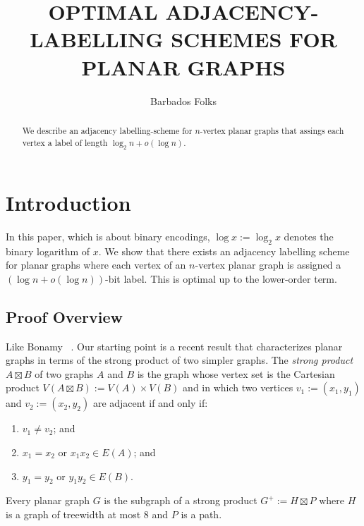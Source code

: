 \documentclass[kpfonts]{patmorin}
\title{\MakeUppercase{Optimal Adjacency-Labelling Schemes for Planar Graphs}}
\author{Barbados Folks}
\begin{document}
\begin{titlepage}
\maketitle

\begin{abstract}
  We describe an adjacency labelling-scheme for $n$-vertex planar graphs that assings each vertex a label of length $\log_2 n+o(\log n)$.
\end{abstract}
\end{titlepage}
\tableofcontents

\newpage

\setcounter{page}{0}
\section{Introduction}

In this paper, which is about binary encodings, $\log x:=\log_2 x$ denotes the binary logarithm of $x$.  We show that there exists an adjacency labelling scheme for planar graphs where each vertex of an $n$-vertex planar graph is assigned a $(\log n+o(\log n))$-bit label.  This is optimal up to the lower-order term.


\subsection{Proof Overview}

Like Bonamy \etal\ \cite{bonamy.gavoille.ea:shorter}.  Our starting point is a recent result that characterizes planar graphs in terms of the strong product of two simpler graphs.  The \emph{strong product} $A\boxtimes B$ of two graphs $A$ and $B$ is the graph whose vertex set is the Cartesian product $V(A\boxtimes B):=V(A)\times V(B)$ and in which two vertices $v_1:=(x_1,y_1)$ and $v_2:=(x_2,y_2)$ are adjacent if and only if:
\begin{enumerate}
  \item  $v_1\neq v_2$; and
  \item $x_1=x_2$ or $x_1x_2\in E(A)$; and
  \item $y_1=y_2$ or $y_1y_2\in E(B)$.
\end{enumerate}

\begin{thm}
  Every planar graph $G$ is the subgraph of a strong product $G^+:=H\boxtimes P$ where $H$ is a graph of treewidth at most 8 and $P$ is a path.
\end{thm}
\end{document}
